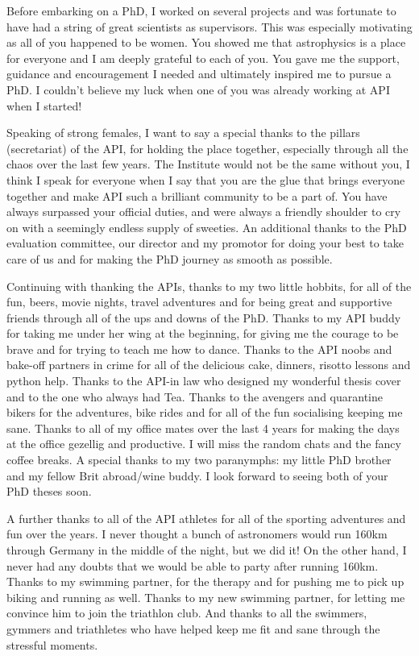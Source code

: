 Before embarking on a PhD, I worked on several projects and was fortunate to have had a string of great scientists as supervisors. This was especially motivating as all of you happened to be women. You showed me that astrophysics is a place for everyone and I am deeply grateful to each of you. You gave me the support, guidance and encouragement I needed and ultimately inspired me to pursue a PhD. I couldn't believe my luck when one of you was already working at API when I started!

Speaking of strong females, I want to say a special thanks to the pillars (secretariat) of the API, for holding the place together, especially through all the chaos over the last few years. The Institute would not be the same without you, I think I speak for everyone when I say that you are the glue that brings everyone together and make API such a brilliant community to be a part of. You have always surpassed your official duties, and were always a friendly shoulder to cry on with a seemingly endless supply of sweeties. An additional thanks to the PhD evaluation committee, our director and my promotor for doing your best to take care of us and for making the PhD journey as smooth as possible.

Continuing with thanking the APIs, thanks to my two little hobbits, for all of the fun, beers, movie nights, travel adventures and for being great and supportive friends through all of the ups and downs of the PhD. Thanks to my API buddy for taking me under her wing at the beginning, for giving me the courage to be brave and for trying to teach me how to dance. Thanks to the API noobs and bake-off partners in crime for all of the delicious cake, dinners, risotto lessons and python help. Thanks to the API-in law who designed my wonderful thesis cover and to the one who always had Tea. Thanks to the avengers and quarantine bikers for the adventures, bike rides and for all of the fun socialising keeping me sane. Thanks to all of my office mates over the last 4 years for making the days at the office gezellig and productive. I will miss the random chats and the fancy coffee breaks. A special thanks to my two paranymphs: my little PhD brother and my fellow Brit abroad/wine buddy. I look forward to seeing both of your PhD theses soon.

A further thanks to all of the API athletes for all of the sporting adventures and fun over the years. I never thought a bunch of astronomers would run 160km through Germany in the middle of the night, but we did it! On the other hand, I never had any doubts that we would be able to party after running 160km. Thanks to my swimming partner, for the therapy and for pushing me to pick up biking and running as well. Thanks to my new swimming partner, for letting me convince him to join the triathlon club. And thanks to all the swimmers, gymmers and triathletes who have helped keep me fit and sane through the stressful moments.

